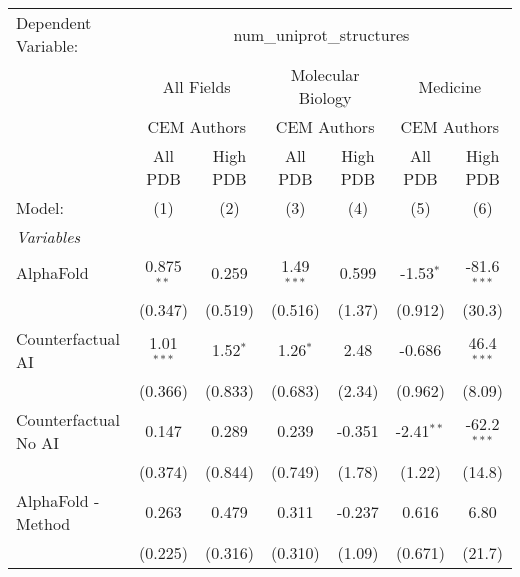 \begingroup
\centering
\begin{tabular}{lcccccc}
   \tabularnewline \midrule \midrule
   Dependent Variable: & \multicolumn{6}{c}{num\_uniprot\_structures}\\
 & \multicolumn{2}{c}{All Fields} & \multicolumn{2}{c}{Molecular Biology} & \multicolumn{2}{c}{Medicine} \\
\cmidrule(lr){2-3} \cmidrule(lr){4-5} \cmidrule(lr){6-7}
 & \multicolumn{2}{c}{CEM Authors} & \multicolumn{2}{c}{CEM Authors} & \multicolumn{2}{c}{CEM Authors} \\
\cmidrule(lr){2-3} \cmidrule(lr){4-5} \cmidrule(lr){6-7}
 & \multicolumn{1}{c}{All PDB} & \multicolumn{1}{c}{High PDB} & \multicolumn{1}{c}{All PDB} & \multicolumn{1}{c}{High PDB} & \multicolumn{1}{c}{All PDB} & \multicolumn{1}{c}{High PDB} \\
\cmidrule(lr){2-2} \cmidrule(lr){3-3} \cmidrule(lr){4-4} \cmidrule(lr){5-5} \cmidrule(lr){6-6} \cmidrule(lr){7-7}
   Model:                                                     & (1)           & (2)           & (3)           & (4)     & (5)          & (6)\\  
   \midrule
   \emph{Variables}\\
   AlphaFold                                                  & 0.875$^{**}$  & 0.259         & 1.49$^{***}$  & 0.599   & -1.53$^{*}$  & -81.6$^{***}$\\   
                                                              & (0.347)       & (0.519)       & (0.516)       & (1.37)  & (0.912)      & (30.3)\\   
   Counterfactual AI                                          & 1.01$^{***}$  & 1.52$^{*}$    & 1.26$^{*}$    & 2.48    & -0.686       & 46.4$^{***}$\\   
                                                              & (0.366)       & (0.833)       & (0.683)       & (2.34)  & (0.962)      & (8.09)\\   
   Counterfactual No AI                                       & 0.147         & 0.289         & 0.239         & -0.351  & -2.41$^{**}$ & -62.2$^{***}$\\   
                                                              & (0.374)       & (0.844)       & (0.749)       & (1.78)  & (1.22)       & (14.8)\\   
   AlphaFold - Method                                         & 0.263         & 0.479         & 0.311         & -0.237  & 0.616        & 6.80\\   
                                                              & (0.225)       & (0.316)       & (0.310)       & (1.09)  & (0.671)      & (21.7)\\   

\end{tabular}
